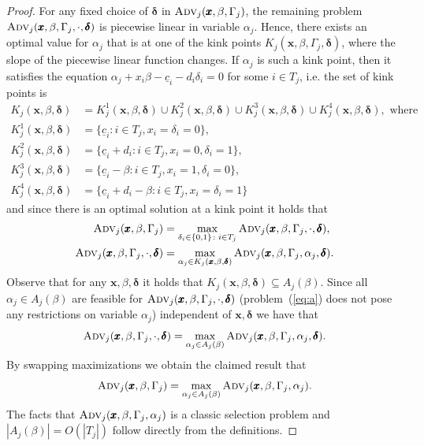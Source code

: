 \begin{proof}
  For any fixed choice of $\pmb{\delta}$ in $\textsc{Adv}_j(\pmb{x},\beta,\Gamma_j)$, the remaining problem $\textsc{Adv}_j(\pmb{x},\beta,\Gamma_j, \cdot, \pmb{\delta})$ is piecewise linear in variable $\alpha_j$.
  Hence, there exists an optimal value for $\alpha_j$ that is at one of the kink points $K_j(\pmb{x}, \beta, \Gamma_j, \pmb{\delta})$, 
  where the slope of the piecewise linear function changes. 
  If $\alpha_j$ is such a kink point, then it satisfies the equation $\alpha_j + x_i \beta - \underline{c}_i - d_i\delta_i = 0$ for some $i \in T_j$,
  i.e. the set of kink points is
  \begin{align*}
  K_j(\pmb{x}, \beta, \pmb{\delta}) &= K_j^1(\pmb{x}, \beta, \pmb{\delta}) \cup K_j^2(\pmb{x}, \beta, \pmb{\delta}) \cup K_j^3(\pmb{x}, \beta, \pmb{\delta}) \cup K_j^4(\pmb{x}, \beta, \pmb{\delta}),\text{ where} \\
  K_j^1(\pmb{x}, \beta, \pmb{\delta}) &= \{\underline{c}_i \colon  i \in T_j, x_i = \delta_i = 0 \}, \\
  K_j^2(\pmb{x}, \beta, \pmb{\delta}) &= \{\underline{c}_i + d_i \colon  i \in T_j, x_i = 0, \delta_i = 1 \}, \\
  K_j^3(\pmb{x}, \beta, \pmb{\delta}) &= \{\underline{c}_i - \beta \colon i \in T_j, x_i = 1, \delta_i = 0 \}, \\
  K_j^4(\pmb{x}, \beta, \pmb{\delta}) &= \{\underline{c}_i +d_i - \beta \colon i \in T_j, x_i = \delta_i = 1 \}
  \end{align*}
  and since there is an optimal solution at a kink point it holds that
\begin{align*}
  \textsc{Adv}_j(\pmb{x},\beta,\Gamma_j) &= \max_{\delta_i \in \{0,1\} \colon i \in T_j} \textsc{Adv}_j(\pmb{x},\beta,\Gamma_j, \cdot, \pmb{\delta}),\\
   \textsc{Adv}_j(\pmb{x},\beta,\Gamma_j, \cdot, \pmb{\delta}) &= \max_{\alpha_j \in K_j(\pmb{x}, \beta, \pmb{\delta})} \textsc{Adv}_j(\pmb{x},\beta,\Gamma_j,\alpha_j, \pmb{\delta}).
\end{align*}
  Observe that for any $\pmb{x}, \beta, \pmb{\delta}$ it holds that $K_j(\pmb{x}, \beta, \pmb{\delta}) \subseteq A_j(\beta)$. 
  Since all $\alpha_j \in A_j(\beta)$ are feasible for $\textsc{Adv}_j(\pmb{x},\beta,\Gamma_j, \cdot, \pmb{\delta})$ (problem~(\ref{eq:a}) does not pose any restrictions on variable $\alpha_j$)
  independent of 
  $\pmb{x}, \pmb{\delta}$ we have that 
  \[ \textsc{Adv}_j(\pmb{x},\beta,\Gamma_j, \cdot, \pmb{\delta}) = \max_{\alpha_j \in A_j(\beta)} \textsc{Adv}_j(\pmb{x},\beta,\Gamma_j,\alpha_j, \pmb{\delta}). \]
  By swapping maximizations we obtain the claimed result that
  \[ \textsc{Adv}_j(\pmb{x},\beta,\Gamma_j) = \max_{\alpha_j \in A_j(\beta)} \textsc{Adv}_j(\pmb{x},\beta,\Gamma_j,\alpha_j). \]
  The facts that $\textsc{Adv}_j(\pmb{x},\beta,\Gamma_j,\alpha_j)$ is a classic selection problem and 
  $|A_j(\beta)| = O(|T_j|)$ follow directly from the definitions.
\end{proof}

